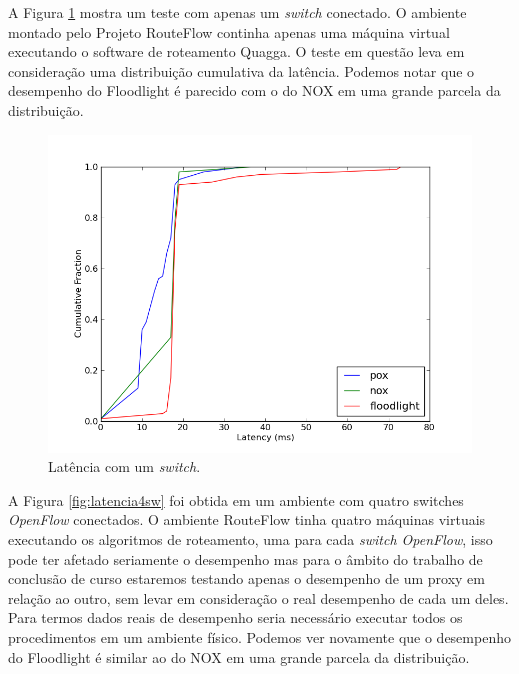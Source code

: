 A Figura \ref{fig:latencia1sw} mostra um teste com apenas
um \textit{switch} conectado. O ambiente montado pelo 
Projeto RouteFlow continha apenas uma máquina virtual
executando o software de roteamento Quagga. O teste em
questão leva em consideração uma distribuição cumulativa da
latência. Podemos notar que o desempenho do Floodlight é
parecido com o do NOX em uma grande parcela da distribuição.

\begin{figure}[h]
\centering
\includegraphics[width=140mm]{latencia_1sw.png}
\caption{Latência com um \textit{switch}.}
\label{fig:latencia1sw} 
\end{figure}

A Figura \ref{fig:latencia4sw} foi obtida em um ambiente com
quatro switches \textit{OpenFlow} conectados. O
ambiente RouteFlow tinha quatro máquinas virtuais executando
os algoritmos de roteamento, uma para cada \textit{switch OpenFlow},
isso pode ter afetado seriamente o desempenho mas para
o âmbito do trabalho de conclusão de curso estaremos 
testando apenas o desempenho de um proxy em relação ao
outro, sem levar em consideração o real desempenho de cada um
deles. Para termos dados reais de desempenho seria necessário
executar todos os procedimentos em um ambiente físico.
 Podemos ver
novamente que o desempenho do Floodlight é similar ao do
NOX em uma grande parcela da distribuição.


